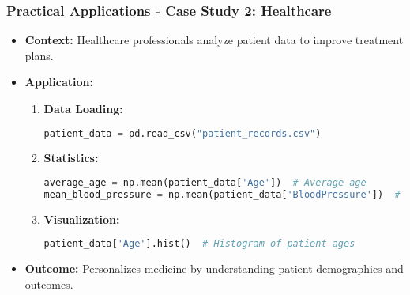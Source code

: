 \documentclass[aspectratio=169]{beamer}
\begin{document}
\begin{frame}[fragile]
    \frametitle{Practical Applications - Case Study 2: Healthcare}
    
    \begin{itemize}
        \item \textbf{Context:}
        Healthcare professionals analyze patient data to improve treatment plans.
        
        \item \textbf{Application:}
        \begin{enumerate}
            \item \textbf{Data Loading:}
            \begin{lstlisting}[language=Python]
patient_data = pd.read_csv("patient_records.csv")
            \end{lstlisting}

            \item \textbf{Statistics:}
            \begin{lstlisting}[language=Python]
average_age = np.mean(patient_data['Age'])  # Average age
mean_blood_pressure = np.mean(patient_data['BloodPressure'])  # Mean blood pressure
            \end{lstlisting}

            \item \textbf{Visualization:}
            \begin{lstlisting}[language=Python]
patient_data['Age'].hist()  # Histogram of patient ages
            \end{lstlisting}
        \end{enumerate}
        
        \item \textbf{Outcome:} Personalizes medicine by understanding patient demographics and outcomes.
    \end{itemize}
\end{frame}
\end{document}
